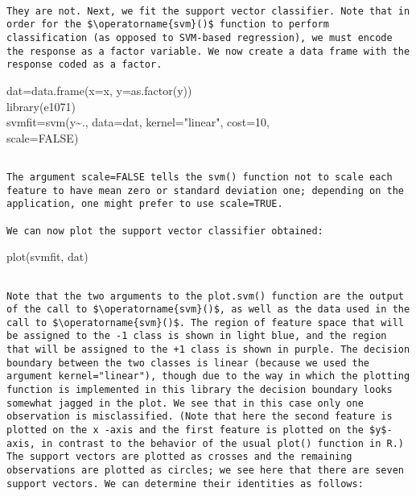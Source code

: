 \documentclass[10pt]{article}
\begin{document}
\begin{verbatim}

They are not. Next, we fit the support vector classifier. Note that in order for the $\operatorname{svm}()$ function to perform classification (as opposed to SVM-based regression), we must encode the response as a factor variable. We now create a data frame with the response coded as a factor.
\end{verbatim}

\begin{displayquote}
dat=data.frame(x=x, y=as.factor(y))\\
library(e1071)\\
svmfit=svm(y\~{}., data=dat, kernel="linear", cost=10,\\
scale=FALSE)
\end{displayquote}

\begin{verbatim}

The argument scale=FALSE tells the svm() function not to scale each feature to have mean zero or standard deviation one; depending on the application, one might prefer to use scale=TRUE.

We can now plot the support vector classifier obtained:
\end{verbatim}

\begin{displayquote}
plot(svmfit, dat)
\end{displayquote}

\begin{verbatim}

Note that the two arguments to the plot.svm() function are the output of the call to $\operatorname{svm}()$, as well as the data used in the call to $\operatorname{svm}()$. The region of feature space that will be assigned to the -1 class is shown in light blue, and the region that will be assigned to the +1 class is shown in purple. The decision boundary between the two classes is linear (because we used the argument kernel="linear"), though due to the way in which the plotting function is implemented in this library the decision boundary looks somewhat jagged in the plot. We see that in this case only one observation is misclassified. (Note that here the second feature is plotted on the x -axis and the first feature is plotted on the $y$-axis, in contrast to the behavior of the usual plot() function in R.) The support vectors are plotted as crosses and the remaining observations are plotted as circles; we see here that there are seven support vectors. We can determine their identities as follows:
\end{verbatim}
\end{document}
